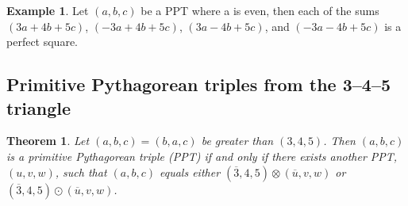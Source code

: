 \documentclass{article}
\newtheorem{theorem}{Theorem}
\theoremstyle{definition}
\newtheorem{example}{Example}[section]
\begin{document}
\begin{example}
Let \((a,b,c)\) be a PPT where a is even, then each of the sums \((3a+4b+5c)\), \((-3a+4b+5c)\), \((3a-4b+5c)\), and \((-3a-4b+5c)\) is a perfect square.
\end{example}

\subsection{Primitive Pythagorean triples from the 3--4--5 triangle}

\begin{theorem}
Let \((a,b,c)=(b,a,c)\) be greater than \((3,4,5)\). Then \((a,b,c)\) is a primitive Pythagorean triple (PPT) if and only if there exists another PPT, \((u,v,w)\), such that \((a,b,c)\) equals either \((\overline{3},4,5) \otimes (\overline{u},v,w)\) or \((\overline{3},4,5) \odot (\overline{u},v,w)\).
\end{theorem}
\end{document}

